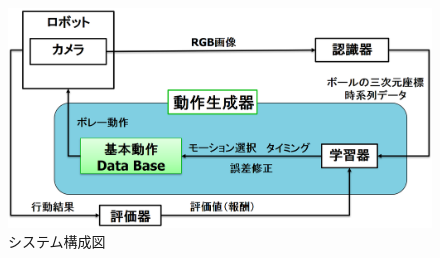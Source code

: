 \documentclass[twocolumn]{preport}
\begin{document}





\begin{figure}[tbh]
 \begin{center}
   \centering
   \includegraphics[width=\columnwidth]{system_fig.png}
   \caption{システム構成図}
   \label{figure:system}
 \end{center}
\end{figure}
\end{document}

